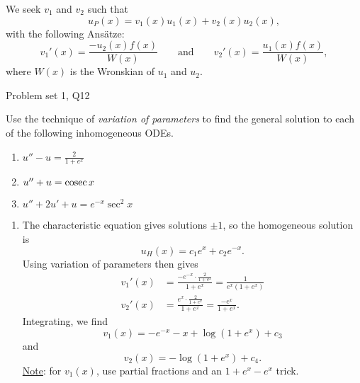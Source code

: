 We seek $v_1$ and $v_2$ such that
    $$ u_P(x) = v_1(x) u_1(x) + v_2(x) u_2(x) , $$
with the following Ansätze:
    $$ v_1'(x) = \frac{-u_2(x) f(x)}{W(x)}
        \qquad \text{and} \qquad
        v_2'(x) = \frac{u_1(x) f(x)}{W(x)} , $$
where $W(x)$ is the Wronskian of $u_1$ and $u_2$.

\begin{problem}{Problem set 1, Q12}{}


    Use the technique of \textit{variation of parameters} to find the general solution to each of the following inhomogeneous ODEs.

    \begin{enumerate}
        \item $u'' - u = \frac{2}{1 + e^x}$
        \item $u'' + u = \operatorname{cosec} x$
        \item $u'' + 2u' + u = e^{-x} \sec^2 x$
    \end{enumerate}

    \tcblower

    \begin{enumerate}
        \item \marginnote{[Easy.]} The characteristic equation gives solutions $\pm 1$, so the homogeneous solution is
            $$ u_H(x) = c_1 e^x + c_2 e^{-x} . $$
        Using variation of parameters then gives
            \begin{align*}
                v_1'(x) &= \frac{-e^{-x} \cdot
                \frac{2}{1 + e^x}}{1 + e^x}
                    = \frac{1}{e^x (1 + e^x)} \\
                v_2'(x) &= \frac{e^x \cdot
                    \frac{2}{1 + e^x}}{1 + e^x}
                    = \frac{-e^x}{1+e^x} .
            \end{align*}
        Integrating, we find
            $$ v_1(x) = -e^{-x} - x + \log(1 + e^x) + c_3 $$
        and
            $$ v_2(x) = -\log(1 + e^x) + c_4 . $$
        \underline{Note}: for $v_1(x)$, use partial fractions and an $1 + e^x - e^x$ trick.


\end{enumerate}
\end{problem}
